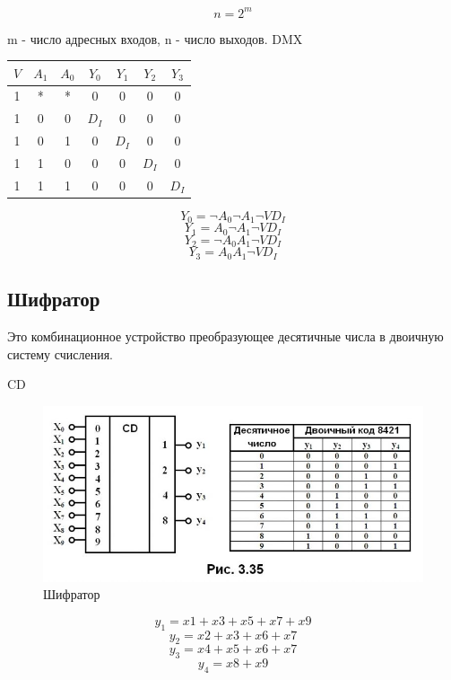 \documentclass[a4paper]{article}
\begin{document}
$$ n = 2^m $$

m - число адресных входов, n - число выходов.
DMX

\begin{table}[ht]
\centering
\begin{tabular}{|c|c|c|c|c|c|c|}
\hline
$V$ & $A_1$ & $A_0$ & $Y_0$ & $Y_1$ & $Y_2$ & $Y_3$\\
\hline
1 & * & * & 0 & 0 & 0 & 0 \\
1 & 0 & 0 & $D_I$ & 0 & 0 & 0 \\
1 & 0 & 1 & 0 & $D_I$ & 0 & 0 \\
1 & 1 & 0 & 0 & 0 & $D_I$ & 0 \\
1 & 1 & 1 & 0 & 0 & 0 & $D_I$ \\
\hline
\end{tabular}
\end{table}
    
$$ Y_0 = \neg A_0\neg A_1\neg VD_I $$
$$ Y_1 = A_0\neg A_1\neg VD_I $$
$$ Y_2 = \neg A_0A_1\neg VD_I $$
$$ Y_3 = A_0A_1\neg VD_I $$

\subsection{Шифратор}
Это комбинационное устройство преобразующее десятичные числа в двоичную систему счисления.

CD
\begin{figure}[ht]
    \centering
    \includegraphics[width=\linewidth/3]{CD.jpg}
    \caption{Шифратор}
\end{figure}

$$ y_1 = x1 + x3 + x5 + x7 + x9 $$
$$ y_2 = x2 + x3 + x6 + x7 $$
$$ y_3 = x4 + x5 + x6 + x7 $$
$$ y_4 = x8 + x9 $$
\end{document}

